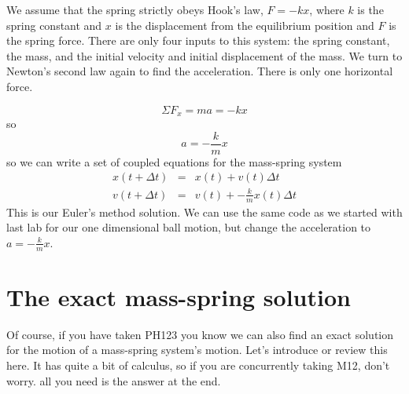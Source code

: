 \documentclass[twoside,11pt,ShortChapTitles]{BYUTextbook}
\begin{document}
We assume that the spring strictly obeys Hook's law, $F=-kx$, where $k$ is
the spring constant and $x$ is the displacement from the equilibrium
position and $F$ is the spring force. There are only four inputs to this
system: the spring constant, the mass, and the initial velocity and initial
displacement of the mass. We turn to Newton's second law again to find the
acceleration. There is only one horizontal force.

\[
\Sigma F_{x}=ma=-kx 
\]%
so%
\[
a=-\frac{k}{m}x 
\]%
so we can write a set of coupled equations for the mass-spring system%
\begin{eqnarray*}
x(t+\Delta t) &=&x(t)+v(t)\Delta t \\
v(t+\Delta t) &=&v(t)+-\frac{k}{m}x(t)\Delta t
\end{eqnarray*}%
This is our Euler's method solution. We can use the same code as we started
with last lab for our one dimensional ball motion, but change the
acceleration to $a=-\frac{k}{m}x.$

\section{The exact mass-spring solution}

Of course, if you have taken PH123 you know we can also find an exact
solution for the motion of a mass-spring system's motion. Let's introduce or
review this here. It has quite a bit of calculus, so if you are concurrently
taking M12, don't worry. all you need is the answer at the end.
\end{document}
